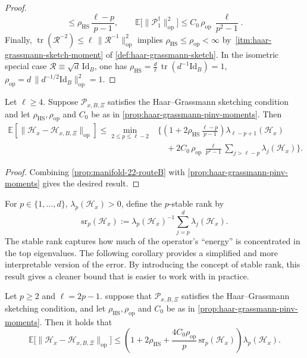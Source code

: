 \documentclass[final,onefignum,onetabnum]{siamart250211}
\begin{document}
\begin{proof}
\[  \le
  \rho_{\mathrm{HS}}\,\frac{\ell-p}{p-1},
  \qquad
  \mathbb E\big[\|\mathcal P_1^{\dagger}\|_{\mathrm{op}}^{2}\big]
  \le
  C_0\,\rho_{\mathrm{op}}\,\frac{\ell}{p^{2}-1}.
  \]
  Finally,
  $
  \operatorname{tr}(\mathcal R^{-2})
  \le
  \ell\,\|\mathcal R^{-1}\|_{\mathrm{op}}^{2}
  $
  implies
  $
  \rho_{\mathrm{HS}}
  \le
  \rho_{\mathrm{op}}
  <
  \infty
  $
  by~\ref{itm:haar-grassmann-sketch-moment} of \cref{def:haar-grassmann-sketch}.
  In the isometric special case $\mathcal R\equiv \sqrt d\,\mathrm{Id}_B$, one has
  $
  \rho_{\mathrm{HS}}
  =
  \frac{d}{\ell}\,\operatorname{tr}(d^{-1}\mathrm{Id}_B)
  =
  1$,
  $
  \rho_{\mathrm{op}}
  =
  d\,\|d^{-1/2}\mathrm{Id}_B\|_{\mathrm{op}}^{2}
  =
  1.
  $
\end{proof}


\begin{theorem}
  \label{thm:manifold-22-haar}
  Let $\ell\ge 4$.
  Suppose $\mathcal{P}_{x, B, \Xi}$ satisfies the Haar--Grassmann sketching condition and let $\rho_{\mathrm{HS}},\rho_{\mathrm{op}}$ and $C_0$ be as in \cref{prop:haar-grassmann-pinv-moments}.
  Then 
  \[
  \begin{aligned}
  \mathbb E\left[ \big\|\mathcal{H}_x-\mathcal{H}_{x, B, \Xi}\big\|_{\mathrm{op}} \right]
  \le
  \min_{2\le p\le \ell-2}
  &\Bigg\{\left(1+2\rho_{\mathrm{HS}}\,\tfrac{\ell-p}{p-1}\right)\lambda_{\ell-p+1}(\mathcal{H}_x)
  \\
  & \quad +2C_0\,\rho_{\mathrm{op}}\,\tfrac{\ell}{p^{2}-1}\sum_{j>\ell-p}\lambda_j(\mathcal{H}_x)
  \Bigg\}.
  \end{aligned}
  \]
\end{theorem}

\begin{proof}
Combining \cref{prop:manifold-22-routeB} with \cref{prop:haar-grassmann-pinv-moments} gives the desired result.
\end{proof}

For $p \in \{1,\dots,d\}$, $\lambda_p(\mathcal{H}_x)>0$, define the $p$-stable rank by
\[
\mathrm{sr}_p(\mathcal{H}_x):=\lambda_p(\mathcal{H}_x)^{-1}\sum_{j=p}^d \lambda_j(\mathcal{H}_x).
\]
The stable rank captures how much of the operator's ``energy'' is concentrated in the top eigenvalues.
The following corollary provides a simplified and more interpretable version of the error. By introducing the concept of stable rank, this result gives a cleaner bound that is easier to work with in practice.
\begin{corollary}
  \label{cor:manifold-23}
  Let $p\ge 2$ and $\ell=2p-1$. 
  suppose that $\mathcal{P}_{x, B, \Xi}$ satisfies the Haar--Grassmann sketching condition, and let $\rho_{\mathrm{HS}},\rho_{\mathrm{op}}$ and $C_0$ be as in \cref{prop:haar-grassmann-pinv-moments}.
  Then it holds that
  \[
  \mathbb E\big[ \|\mathcal{H}_x-\mathcal{H}_{x, B, \Xi}\|_{\mathrm{op}} \big]
  \le
  \left(1+2\rho_{\mathrm{HS}}+\frac{4C_0\rho_{\mathrm{op}}}{p}\,\mathrm{sr}_p(\mathcal{H}_x)\right)\lambda_p(\mathcal{H}_x).
  \]
\end{corollary}
\end{document}

